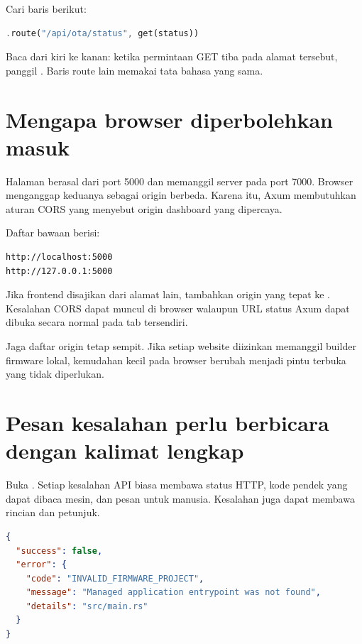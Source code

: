 Cari baris berikut:

\begin{lstlisting}[language=Rust,numbers=none]
.route("/api/ota/status", get(status))
\end{lstlisting}

Baca dari kiri ke kanan: ketika permintaan GET tiba pada alamat tersebut, panggil . Baris route lain memakai tata bahasa yang sama.

\section{Mengapa browser diperbolehkan masuk}

Halaman berasal dari port 5000 dan memanggil server pada port 7000. Browser menganggap keduanya sebagai origin berbeda. Karena itu, Axum membutuhkan aturan CORS yang menyebut origin dashboard yang dipercaya.

Daftar bawaan berisi:

\begin{lstlisting}[numbers=none]
http://localhost:5000
http://127.0.0.1:5000
\end{lstlisting}

Jika frontend disajikan dari alamat lain, tambahkan origin yang tepat ke . Kesalahan CORS dapat muncul di browser walaupun URL status Axum dapat dibuka secara normal pada tab tersendiri.

\begin{warningbox}
Jaga daftar origin tetap sempit. Jika setiap website diizinkan memanggil builder firmware lokal, kemudahan kecil pada browser berubah menjadi pintu terbuka yang tidak diperlukan.
\end{warningbox}

\section{Pesan kesalahan perlu berbicara dengan kalimat lengkap}

Buka . Setiap kesalahan API biasa membawa status HTTP, kode pendek yang dapat dibaca mesin, dan pesan untuk manusia. Kesalahan juga dapat membawa rincian dan petunjuk.

\begin{lstlisting}[language=JSON,numbers=none]
{
  "success": false,
  "error": {
    "code": "INVALID_FIRMWARE_PROJECT",
    "message": "Managed application entrypoint was not found",
    "details": "src/main.rs"
  }
}
\end{lstlisting}

